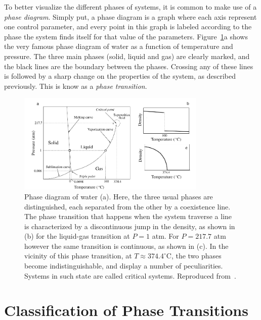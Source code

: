 To better visualize the different phases of systems, it is common to make use
of a \textit{phase diagram}. Simply put, a phase diagram is a graph where each
axis represent one control parameter, and every point in this graph is labeled
according to the phase the system finds itself for that value of the
parameters. Figure~\ref{fig:water}a shows the very famous phase diagram of
water as a function of temperature and pressure. The three main phases (solid,
liquid and gas) are clearly marked, and the black lines are the boundary
between the phases. Crossing any of these lines is followed by a sharp change
on the properties of the system, as described previously. This is know as a
\textit{phase transition}.

\begin{figure}[t]
\begin{center}
    \includegraphics[width=0.8\textwidth]{chapters/ch2-crit/figs/water}
\end{center}
\caption{Phase diagram of water (a). Here, the three usual phases are
    distinguished, each separated from the other by a coexistence line. The
    phase transition that happens when the system traverse a line is
    characterized by a discontinuous jump in the density, as shown in (b) for
    the liquid-gas transition at $P=1$ atm. For $P=217.7$ atm however the same
    transition is continuous, as shown in (c). In the vicinity of this phase
    transition, at $T\approx374.4^\circ$C, the two phases become
    indistinguishable, and display a number of peculiarities. Systems in such
    state are called critical systems. Reproduced from~\cite{Sole2011}.}
\label{fig:water}
\end{figure}


\section{Classification of Phase Transitions}
\label{sec:classification}

